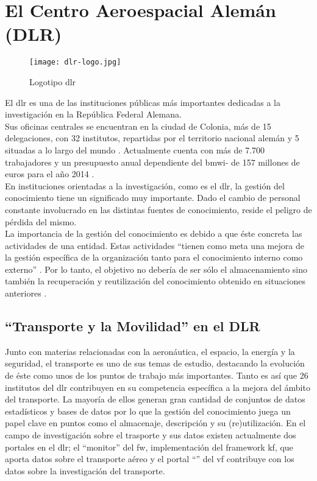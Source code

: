 \section{El Centro Aeroespacial Alemán (DLR)}
\label{section:dlr}

\begin{wrapfigure}{r}{0.3\textwidth}
  \begin{center}
    \texttt{[image: dlr-logo.jpg]}
  \end{center}
  \caption{Logotipo \gls{dlr}}
\end{wrapfigure}

El \gls{dlr} es una de las instituciones públicas más importantes dedicadas a la investigación en la República Federal Alemana.\\ 

Sus oficinas centrales se encuentran en la ciudad de Colonia, más de 15 delegaciones, con 32 institutos, repartidas por el territorio nacional alemán y 5 situadas a lo largo del mundo \cite{dlrort}. Actualmente cuenta con más de 7.700 trabajadores y un presupuesto anual dependiente del \gls{bmwi}- de 157 millones de euros para el año 2014 \cite{haushalt2014}.\\


En instituciones orientadas a la investigación, como es el \gls{dlr}, la gestión del conocimiento tiene un significado muy importante. Dado el cambio de personal constante involucrado en las distintas fuentes de conocimiento, reside el peligro de pérdida del mismo. \\

La importancia de la gestión del conocimiento es debido a que éste concreta las actividades de una entidad. Estas actividades ``tienen como meta una mejora de la gestión específica de la organización tanto para el conocimiento interno como externo'' \cite{cissek}. Por lo tanto, el objetivo no debería de ser sólo el almacenamiento sino también la recuperación y reutilización del conocimiento obtenido en situaciones anteriores \cite{dengel}.\\


\subsection{``Transporte y la Movilidad'' en el DLR}

Junto con materias relacionadas con la aeronáutica, el espacio, la energía y la seguridad, el transporte es uno de sus temas de estudio, destacando la evolución de éste como unos de los puntos de trabajo más importantes. Tanto es así que 26 institutos del \gls{dlr} contribuyen en su competencia específica a la mejora del ámbito del transporte. La mayoría de ellos generan gran cantidad de conjuntos de datos estadísticos y bases de datos por lo que la gestión del conocimiento juega un papel clave en puntos como el almacenaje, descripción y su (re)utilización. En el campo de investigación sobre el trasporte y sus datos existen actualmente dos portales en el \gls{dlr}; el ``\gls{monitor}'' del \gls{fw}, implementación del \gls{framework}  \gls{kf}, que aporta datos sobre el transporte aéreo y el portal ``\cs'' del \gls{vf} contribuye con los datos sobre la investigación del transporte.


